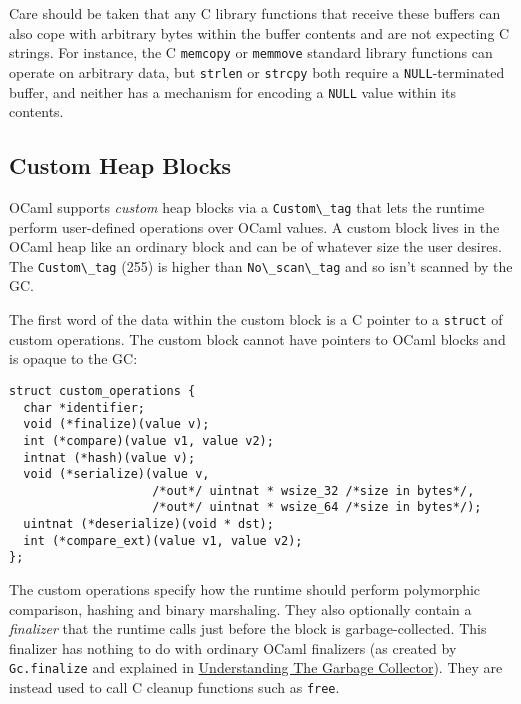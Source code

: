 Care should be taken that any C library functions that receive these
buffers can also cope with arbitrary bytes within the buffer contents
and are not expecting C strings. For instance, the C
\passthrough{\lstinline!memcopy!} or \passthrough{\lstinline!memmove!}
standard library functions can operate on arbitrary data, but
\passthrough{\lstinline!strlen!} or \passthrough{\lstinline!strcpy!}
both require a \passthrough{\lstinline!NULL!}-terminated buffer, and
neither has a mechanism for encoding a \passthrough{\lstinline!NULL!}
value within its contents.

\hypertarget{custom-heap-blocks}{%
\subsection{Custom Heap Blocks}\label{custom-heap-blocks}}

OCaml supports \emph{custom} heap blocks via a
\passthrough{\lstinline!Custom\_tag!} that lets the runtime perform
user-defined operations over OCaml values. A custom block lives in the
OCaml heap like an ordinary block and can be of whatever size the user
desires. The \passthrough{\lstinline!Custom\_tag!} (255) is higher than
\passthrough{\lstinline!No\_scan\_tag!} and so isn't scanned by the GC.

The first word of the data within the custom block is a C pointer to a
\passthrough{\lstinline!struct!} of custom operations. The custom block
cannot have pointers to OCaml blocks and is opaque to the GC:

\begin{lstlisting}
struct custom_operations {
  char *identifier;
  void (*finalize)(value v);
  int (*compare)(value v1, value v2);
  intnat (*hash)(value v);
  void (*serialize)(value v,
                    /*out*/ uintnat * wsize_32 /*size in bytes*/,
                    /*out*/ uintnat * wsize_64 /*size in bytes*/);
  uintnat (*deserialize)(void * dst);
  int (*compare_ext)(value v1, value v2);
};
\end{lstlisting}

The custom operations specify how the runtime should perform polymorphic
comparison, hashing and binary marshaling. They also optionally contain
a \emph{finalizer} that the runtime calls just before the block is
garbage-collected. This finalizer has nothing to do with ordinary OCaml
finalizers (as created by \passthrough{\lstinline!Gc.finalize!} and
explained in
\href{garbage-collector.html\#understanding-the-garbage-collector}{Understanding
The Garbage Collector}). They are instead used to call C cleanup
functions such as \passthrough{\lstinline!free!}.

